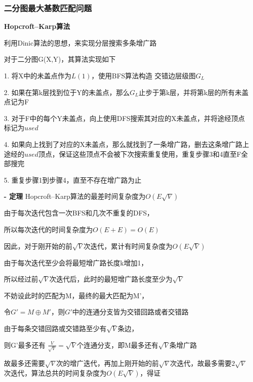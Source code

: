 \documentclass[UTF8]{ctexart}
\begin{document}
\vspace{0.8cm}


\subsubsection{二分图最大基数匹配问题}

\textbf{Hopcroft–Karp算法}\cite{hopcroft1973n}

利用Dinic算法的思想，来实现分层搜索多条增广路

对于二分图G(X,Y)，其算法实现如下

\vspace{0.5cm}

1. 将X中的未盖点作为$L(1)$，使用BFS算法构造 交错边层级图$G_L$

2. 如果在第k层找到位于Y的未盖点，那么$G_L$止步于第k层，并将第k层的所有未盖点记为F

3. 对于F中的每个Y未盖点，向上使用DFS搜索其对应的X未盖点，并将途经顶点标记为$used$

4. 如果向上找到了对应的X未盖点，那么就找到了一条增广路，删去这条增广路上途经的$used$顶点，保证这些顶点不会被下次搜索重复使用，重复步骤3和4直至F全部搜完

5. 重复步骤1到步骤4，直至不存在增广路为止

\vspace{1.5cm}

\textbf{- 定理}
Hopcroft–Karp算法的最差时间复杂度为$O(E\sqrt{V})$

由于每次迭代包含一次BFS和几次不重复的DFS，

所以每次迭代的时间复杂度为$O(E+E)=O(E)$

因此，对于刚开始的前$\sqrt{V}$次迭代，累计有时间复杂度为$O(E\sqrt{V})$

由于每次迭代至少会将最短增广路长度k增加1，

所以经过前$\sqrt{V}$次迭代后，此时的最短增广路长度至少为$\sqrt{V}$

不妨设此时的匹配为M，最终的最大匹配为M'，

令$G'=M\oplus M'$，则$G'$中的连通分支皆为交错回路或者交错路

由于每条交错回路或交错路至少有$\sqrt{V}$条边，

则G'最多还有 $\frac{V}{\sqrt{V}}=\sqrt{V}$个连通分支，即M最多还有$\sqrt{V}$条增广路

故最多还需要$\sqrt{V}$次的增广迭代，再加上刚开始的前$\sqrt{V}$次迭代，故最多需要$2\sqrt{V}$次迭代，算法总共的时间复杂度为$O(E\sqrt{V})$，得证

\vspace{0.8cm}
\end{document}
